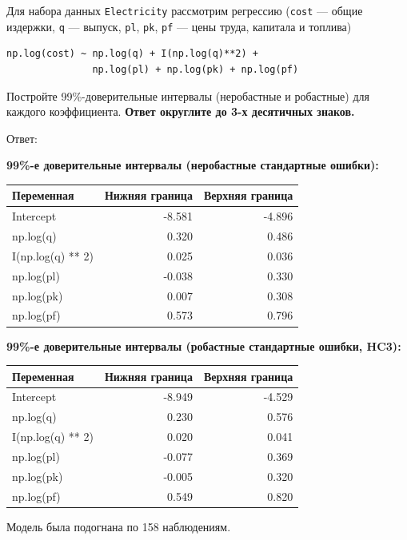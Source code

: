 \documentclass[
  russian,
]{article}
\newcounter{none} %
\begin{document}
Для набора данных \texttt{Electricity} рассмотрим регрессию
(\texttt{cost} --- общие издержки, \texttt{q} --- выпуск, \texttt{pl},
\texttt{pk}, \texttt{pf} --- цены труда, капитала и топлива)

\begin{verbatim}
np.log(cost) ~ np.log(q) + I(np.log(q)**2) +
               np.log(pl) + np.log(pk) + np.log(pf)
\end{verbatim}

Постройте 99\%-доверительные интервалы (неробастные и робастные) для
каждого коэффициента. \textbf{Ответ округлите до 3-х десятичных знаков.}

Ответ:

\textbf{99\%-е доверительные интервалы (неробастные стандартные
ошибки):}

{\def\LTcaptype{none} %
\begin{longtable}[]{@{}lrr@{}}
\toprule\noalign{}
Переменная & Нижняя граница & Верхняя граница \\
\midrule\noalign{}
\endhead
\bottomrule\noalign{}
\endlastfoot
Intercept & -8.581 & -4.896 \\
np.log(q) & 0.320 & 0.486 \\
I(np.log(q) ** 2) & 0.025 & 0.036 \\
np.log(pl) & -0.038 & 0.330 \\
np.log(pk) & 0.007 & 0.308 \\
np.log(pf) & 0.573 & 0.796 \\
\end{longtable}
}

\textbf{99\%-е доверительные интервалы (робастные стандартные ошибки,
HC3):}

{\def\LTcaptype{none} %
\begin{longtable}[]{@{}lrr@{}}
\toprule\noalign{}
Переменная & Нижняя граница & Верхняя граница \\
\midrule\noalign{}
\endhead
\bottomrule\noalign{}
\endlastfoot
Intercept & -8.949 & -4.529 \\
np.log(q) & 0.230 & 0.576 \\
I(np.log(q) ** 2) & 0.020 & 0.041 \\
np.log(pl) & -0.077 & 0.369 \\
np.log(pk) & -0.005 & 0.320 \\
np.log(pf) & 0.549 & 0.820 \\
\end{longtable}
}

Модель была подогнана по 158 наблюдениям.
\end{document}
